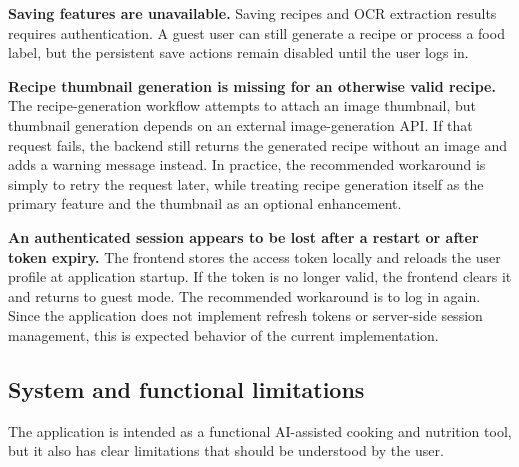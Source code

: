 \textbf{Saving features are unavailable.}
Saving recipes and OCR extraction results requires authentication. A
guest user can still generate a recipe or process a food label, but
the persistent save actions remain disabled until the user logs in.

\textbf{Recipe thumbnail generation is missing for an otherwise valid
recipe.}
The recipe-generation workflow attempts to attach an image thumbnail,
but thumbnail generation depends on an external image-generation API.
If that request fails, the backend still returns the generated recipe
without an image and adds a warning message instead. In practice, the
recommended workaround is simply to retry the request later, while
treating recipe generation itself as the primary feature and the
thumbnail as an optional enhancement.

\textbf{An authenticated session appears to be lost after a restart or
after token expiry.}
The frontend stores the access token locally and reloads the user
profile at application startup. If the token is no longer valid, the
frontend clears it and returns to guest mode. The recommended
workaround is to log in again. Since the application does not
implement refresh tokens or server-side session management, this is
expected behavior of the current implementation.

\subsection{System and functional limitations}

The application is intended as a functional AI-assisted cooking and
nutrition tool, but it also has clear limitations that should be
understood by the user.

